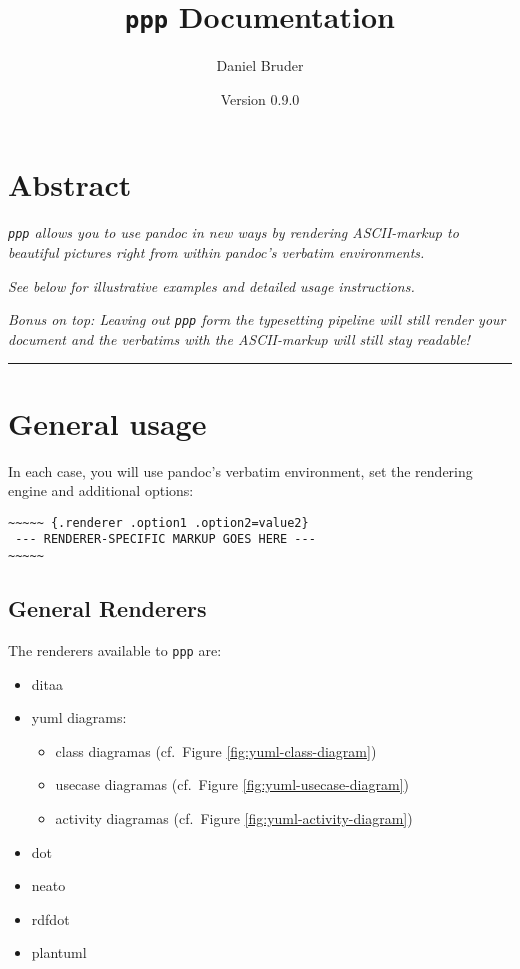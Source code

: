 \documentclass[]{article}
\title{\texttt{ppp} Documentation}
\author{Daniel Bruder}
\date{Version 0.9.0}
\begin{document}
\maketitle

\newpage

\section{Abstract}\label{abstract}

\emph{\texttt{ppp} allows you to use pandoc in new ways by rendering
ASCII-markup to beautiful pictures right from within pandoc's verbatim
environments.}

\emph{See below for illustrative examples and detailed usage
instructions.}

\emph{Bonus on top: Leaving out \texttt{ppp} form the typesetting
pipeline will still render your document and the verbatims with the
ASCII-markup will still stay readable!}

\begin{center}\rule{3in}{0.4pt}\end{center}

\newpage
\tableofcontents
\newpage

\section{General usage}\label{general-usage}

In each case, you will use pandoc's verbatim environment, set the
rendering engine and additional options:

\begin{verbatim}
~~~~~ {.renderer .option1 .option2=value2}
 --- RENDERER-SPECIFIC MARKUP GOES HERE ---
~~~~~
\end{verbatim}

\subsection{General Renderers}\label{general-renderers}

The renderers available to \texttt{ppp} are:

\begin{itemize}
\itemsep1pt\parskip0pt
\item
  ditaa
\item
  yuml diagrams:

  \begin{itemize}
  \itemsep1pt\parskip0pt
  \item
    class diagramas (cf.~Figure \ref{fig:yuml-class-diagram})
  \item
    usecase diagramas (cf.~Figure \ref{fig:yuml-usecase-diagram})
  \item
    activity diagramas (cf.~Figure \ref{fig:yuml-activity-diagram})
  \end{itemize}
\item
  dot
\item
  neato
\item
  rdfdot
\item
  plantuml
\end{itemize}
\end{document}
